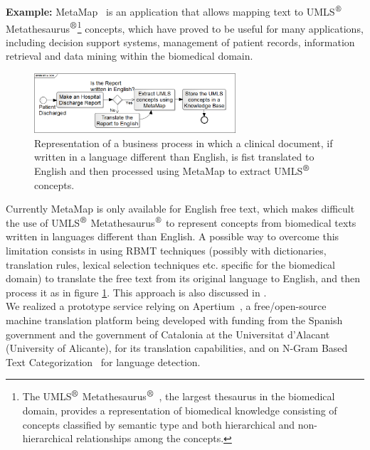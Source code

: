 \documentclass[11pt]{article}
\begin{document}
{\bf Example:} MetaMap~\citep{metamap} is an application that allows mapping text to UMLS$^{\mbox{\small\textregistered}}$ 
Metathesaurus$^{\mbox{\small\textregistered}}$\footnote{The UMLS$^{\mbox{\small\textregistered}}$ Metathesaurus$^{\mbox{\small\textregistered}}$~\citep{umls}, 
the largest thesaurus in the biomedical domain, provides a representation of biomedical knowledge consisting of concepts classified by semantic 
type and both hierarchical and non-hierarchical relationships among the concepts.} concepts, which have proved to be useful for many applications, 
including decision support systems, management of patient records, information retrieval and data mining within the biomedical domain.

\begin{figure}[!ht]
\begin{center}
\includegraphics[width=7.5cm]{mtsoa}
\end{center}
\caption{Representation of a business process in which a clinical document, if written in a language different than English, is fist translated
  to English and then processed using MetaMap to extract UMLS$^{\mbox{\small\textregistered}}$ concepts.}
\label{fig:mtsoa}
\end{figure}

Currently MetaMap is only available for English free text, which makes difficult the use of UMLS$^{\mbox{\small\textregistered}}$ 
Metathesaurus$^{\mbox{\small\textregistered}}$ to represent concepts from biomedical texts written in languages different than English.
A possible way to overcome this limitation consists in using RBMT techniques (possibly with dictionaries, translation rules, 
lexical selection techniques etc. specific for the biomedical domain) to translate the free text from its original language 
to English, and then process it as in figure \ref{fig:mtsoa}. This approach is also discussed in .\\

We realized a prototype service relying on Apertium~\citep{armentano05p}, a free/open-source machine translation platform being 
developed with funding from the Spanish government and the government of Catalonia at the Universitat d'Alacant (University of Alicante), 
for its translation capabilities, and on N-Gram Based Text Categorization~\citep{textcat} for language detection.
\end{document}
